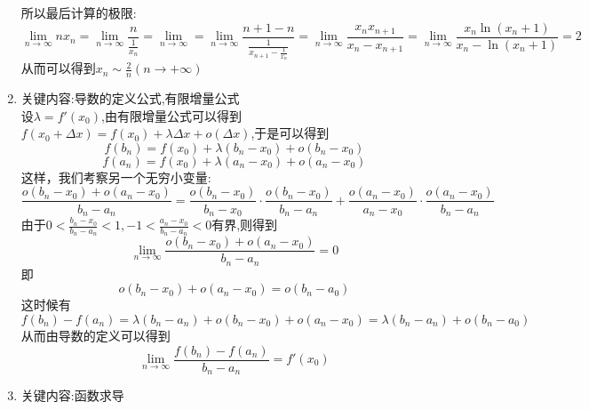 \documentclass[UTF8,a4paper,10pt]{ctexart}
\begin{document}
\begin{flushleft}
\begin{enumerate}
			所以最后计算的极限:
			\begin{equation}
				\lim\limits_{n\rightarrow\infty}nx_{n}=\lim\limits_{n\rightarrow\infty}\frac{n}{\frac{1}{x_{n}}}=\lim\limits_{n\rightarrow\infty}
				=\lim\limits_{n\rightarrow\infty}\frac{n+1-n}{\frac{1}{x_{n+1}-\frac{1}{x_{n}}}}=\lim\limits_{n\rightarrow\infty}\frac{x_{n}x_{n+1}}{x_{n}-x_{n+1}}
				=\lim\limits_{n\rightarrow\infty}\frac{x_{n}\ln(x_{n}+1)}{x_{n}-\ln(x_{n}+1)}=2\nonumber
			\end{equation}
			从而可以得到$x_{n}\sim\frac{2}{n}(n\rightarrow+\infty)$
			\item 关键内容:导数的定义公式,有限增量公式\\
			设$\lambda=f{'}(x_{0})$,由有限增量公式可以得到$f(x_{0}+\Delta{x})=f(x_{0})+\lambda\Delta{x}+o(\Delta{x})$,于是可以得到
			\begin{equation}
				f(b_{n})=f(x_{0})+\lambda(b_{n}-x_{0})+o(b_{n}-x_{0})\nonumber
			\end{equation}
			\begin{equation}
				f(a_{n})=f(x_{0})+\lambda(a_{n}-x_{0})+o(a_{n}-x_{0})\nonumber
			\end{equation}
			这样，我们考察另一个无穷小变量:
			\begin{equation}
				\frac{o(b_{n}-x_{0})+o(a_{n}-x_{0})}{b_{n}-a_{n}}=\frac{o(b_{n}-x_{0})}{b_{n}-x_{0}}\cdot{\frac{o(b_{n}-x_{0})}{b_{n}-a_{n}}}
				+\frac{o(a_{n}-x_{0})}{a_{n}-x_{0}}\cdot{\frac{o(a_{n}-x_{0})}{b_{n}-a_{n}}}\nonumber
			\end{equation}
			由于$0<\frac{b_{n}-x_{0}}{b_{n}-a_{n}}<1,-1<\frac{a_{n}-x_{0}}{b_{n}-a_{n}}<0$有界,则得到
			\begin{equation}
				\lim\limits_{n\rightarrow\infty}\frac{o(b_{n}-x_{0})+o(a_{n}-x_{0})}{b_{n}-a_{n}}=0\nonumber
			\end{equation}
			即
			\begin{equation}
				o(b_{n}-x_{0})+o(a_{n}-x_{0}) = o(b_{n}-a_{0})\nonumber
			\end{equation}
			这时候有
			\begin{equation}
				f(b_{n})-f(a_{n})=\lambda(b_{n}-a_{n})+o(b_{n}-x_{0})+o(a_{n}-x_{0}) =\lambda(b_{n}-a_{n})+ o(b_{n}-a_{0})\nonumber
			\end{equation}
			从而由导数的定义可以得到
			\begin{equation}
				\lim\limits_{n\rightarrow\infty}\frac{f(b_{n})-f(a_{n})}{b_{n}-a_{n}}=f{'}(x_{0})\nonumber
			\end{equation}
			\item 关键内容:函数求导\\

\end{enumerate}
\end{flushleft}
\end{document}
